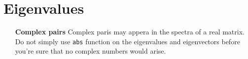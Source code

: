 \documentclass[a4paper,10pt]{article}
\begin{document}
\section{Eigenvalues}


\begin{enumerate}
    \item [\textbf{Complex pairs}] Complex paris may appera in the spectra of a real matrix. Do not simply use \texttt{abs} function on the eigenvalues and eigenvectors before you're sure that no complex numbers would arise.
\end{enumerate}




\end{document}
